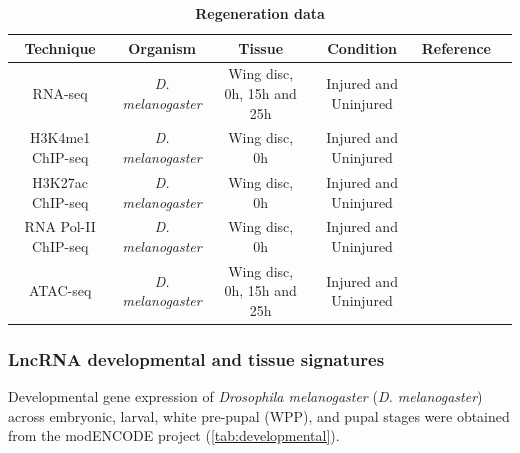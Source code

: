 \begin{table}[!htb]
  \caption[Regeneration data]{\textbf{Regeneration data}}
  \begin{scriptsize}
    \begin{tabulary}{0.95\linewidth}{cccccc}
      \textbf{Technique} & \textbf{Organism} & \textbf{Tissue} & \textbf{Condition} & \textbf{Reference} \\ \hline
      RNA-seq & \textit{D. melanogaster} & Wing disc, 0h, 15h and 25h & Injured and Uninjured & \autocite{vizcaya_2018} \\
      H3K4me1 ChIP-seq & \textit{D. melanogaster} & Wing disc, 0h & Injured and Uninjured & \autocite{vizcaya_2018}   \\
      H3K27ac ChIP-seq & \textit{D. melanogaster} & Wing disc, 0h & Injured and Uninjured & \autocite{vizcaya_2018}   \\
      RNA Pol-II ChIP-seq & \textit{D. melanogaster} & Wing disc, 0h & Injured and Uninjured & \autocite{vizcaya_2018}   \\
      ATAC-seq & \textit{D. melanogaster} & Wing disc, 0h, 15h and 25h & Injured and Uninjured & \autocite{vizcaya_2018}  \\
    \end{tabulary}
  \end{scriptsize}
  \label{tab:regeneration-dataset}
\end{table}

\subsubsection{LncRNA developmental and tissue signatures}
\label{sec:materials-dme-two}

Developmental gene expression of \textit{Drosophila melanogaster} (\textit{D. melanogaster}) across embryonic, larval, white pre-pupal (WPP), and pupal stages were obtained from the modENCODE project\autocite{celniker_2009,modencode_2010} (\autoref{tab:developmental}).
  
